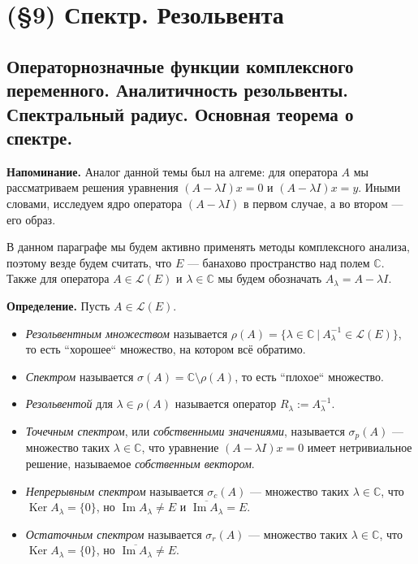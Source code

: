 \documentclass[12pt, a4paper]{article}
\DeclareMathOperator{\im}{Im}
\DeclareMathOperator{\Ker}{Ker}
\begin{document}
\section{(§9) Спектр. Резольвента}

\subsection{Операторнозначные функции комплексного переменного. Аналитичность резольвенты. Спектральный радиус. Основная теорема о спектре.}

\textbf{Напоминание.} Аналог данной темы был на алгеме: для оператора $A$ мы рассматриваем решения уравнения $(A - \lambda I) x = 0$ и $(A - \lambda I) x = y$.
Иными словами, исследуем ядро оператора $(A - \lambda I)$ в первом случае, а во втором --- его образ.

В данном параграфе мы будем активно применять методы комплексного анализа, поэтому везде будем считать, что $E$ --- банахово пространство над полем $\mathbb C$.
Также для оператора $A \in \mathcal L(E)$ и $\lambda \in \mathbb C$ мы будем обозначать $A_\lambda = A - \lambda I$.

\textbf{Определение.} Пусть $A \in \mathcal L(E)$.
\begin{itemize}
    \item \textit{Резольвентным множеством} называется $\rho(A) = \{\lambda \in \mathbb C~|~A_\lambda^{-1} \in \mathcal L(E)\}$, то есть ``хорошее`` множество, на котором всё обратимо.
    \item \textit{Спектром} называется $\sigma(A) = \mathbb C \setminus \rho(A)$, то есть ``плохое`` множество.
    \item \textit{Резольвентой} для $\lambda \in \rho(A)$ называется оператор $R_\lambda := A_\lambda^{-1}$.
    \item \textit{Точечным спектром}, или \textit{собственными значениями}, называется $\sigma_p(A)$ --- множество таких $\lambda \in \mathbb C$, что уравнение $(A - \lambda I) x = 0$ имеет нетривиальное решение, называемое \textit{собственным вектором}.
    \item \textit{Непрерывным спектром} называется $\sigma_c(A)$ --- множество таких $\lambda \in \mathbb C$, что $\Ker A_\lambda = \{0\}$, но $\im A_\lambda \ne E$ и $\overline{\im A_\lambda} = E$.
    \item \textit{Остаточным спектром} называется $\sigma_r(A)$ --- множество таких $\lambda \in \mathbb C$, что $\Ker A_\lambda = \{0\}$, но $\overline{\im A_\lambda} \ne E$.
\end{itemize}
\end{document}
